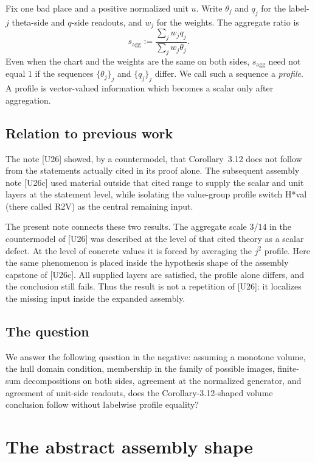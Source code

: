 \documentclass[11pt]{article}
\theoremstyle{definition}
\begin{document}
Fix one bad place and a positive normalized unit $u$.  Write
$\theta_j$ and $q_j$ for the label-$j$ theta-side and $q$-side
readouts, and $w_j$ for the weights.  The aggregate ratio is
\[
s_{\mathrm{agg}}
  :=\frac{\sum_j w_jq_j}{\sum_jw_j\theta_j}.
\]
Even when the chart and the weights are the same on both sides,
$s_{\mathrm{agg}}$ need not equal $1$ if the sequences
$\{\theta_j\}_j$ and $\{q_j\}_j$ differ.  We call such a sequence
a \emph{profile}.  A profile is vector-valued information which
becomes a scalar only after aggregation.

\subsection{Relation to previous work}

The note [U26] showed, by a countermodel, that
Corollary~3.12 does not follow from the statements actually cited
in its proof alone.  The subsequent assembly note [U26c] used
material outside that cited range to supply the scalar and unit
layers at the statement level, while isolating the value-group
profile switch H*val (there called R2V) as the central remaining
input.

The present note connects these two results.  The aggregate scale
$3/14$ in the countermodel of [U26] was described at the level of
that cited theory as a scalar defect.  At the level of concrete
values it is forced by averaging the $j^2$ profile.  Here the same
phenomenon is placed inside the hypothesis shape of the assembly
capstone of [U26c].  All supplied layers are satisfied, the
profile alone differs, and the conclusion still fails.  Thus the
result is not a repetition of [U26]: it localizes the missing
input inside the expanded assembly.

\subsection{The question}

We answer the following question in the negative: assuming a
monotone volume, the hull domain condition, membership in the
family of possible images, finite-sum decompositions on both
sides, agreement at the normalized generator, and agreement of
unit-side readouts, does the Corollary-3.12-shaped volume
conclusion follow without labelwise profile equality?

\section{The abstract assembly shape}
\end{document}
